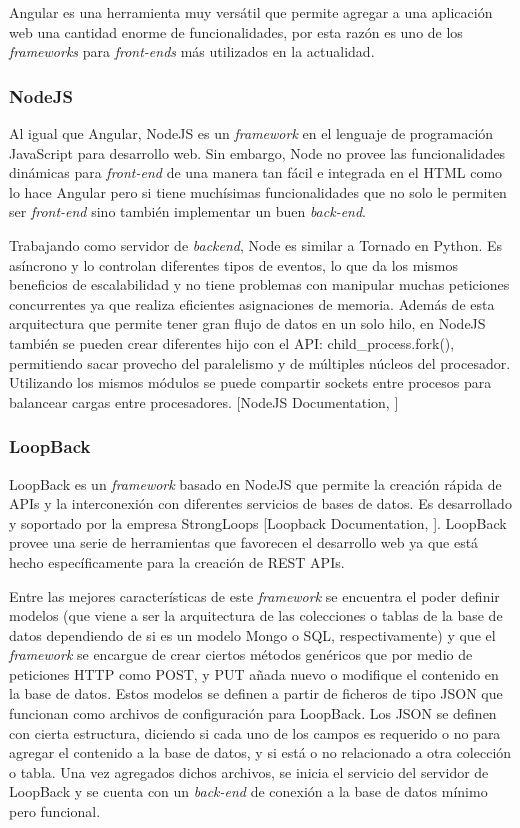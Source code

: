Angular es una herramienta muy versátil que permite agregar a una aplicación web una cantidad enorme de funcionalidades, por esta razón es uno de los \textit{frameworks} para \textit{front-ends} más utilizados en la actualidad.

\subsubsection{NodeJS}

Al igual que Angular, NodeJS es un \textit{framework} en el lenguaje de programación JavaScript para desarrollo web. Sin embargo, Node no provee las funcionalidades dinámicas para \textit{front-end} de una manera tan fácil e integrada en el HTML como lo hace Angular pero si tiene muchísimas funcionalidades que no solo le permiten ser \textit{front-end} sino también implementar un buen \textit{back-end}.

Trabajando como servidor de \textit{backend}, Node es similar a Tornado en Python. Es asíncrono y lo controlan diferentes tipos de eventos, lo que da los mismos beneficios de escalabilidad y no tiene problemas con manipular muchas peticiones concurrentes ya que realiza eficientes asignaciones de memoria. Además de esta arquitectura que permite tener gran flujo de datos en un solo hilo, en NodeJS también se pueden crear diferentes hijo con el API: child\_process.fork(), permitiendo sacar provecho del paralelismo y de múltiples núcleos del procesador. Utilizando los mismos módulos se puede compartir sockets entre procesos para balancear cargas entre procesadores. [NodeJS Documentation, \cite{nodejsdocs}]

\subsubsection{LoopBack}

LoopBack es un \textit{framework} basado en NodeJS que permite la creación rápida de APIs y la interconexión con diferentes servicios de bases de datos. Es desarrollado y soportado por la empresa StrongLoops [Loopback Documentation, \cite{loopbackdocs}]. LoopBack provee una serie de herramientas que favorecen el desarrollo web ya que está hecho específicamente para la creación de REST APIs.

Entre las mejores características de este \textit{framework} se encuentra el poder definir modelos (que viene a ser la arquitectura de las colecciones o tablas de la base de datos dependiendo de si es un modelo Mongo o SQL, respectivamente) y que el \textit{framework} se encargue de crear ciertos métodos genéricos que por medio de peticiones HTTP como POST, y PUT añada nuevo o modifique el contenido en la base de datos. Estos modelos se definen a partir de ficheros de tipo JSON que funcionan como archivos de configuración para LoopBack. Los JSON se definen con cierta estructura, diciendo si cada uno de los campos es requerido o no para agregar el contenido a la base de datos, y si está o no relacionado a otra colección o tabla. Una vez agregados dichos archivos, se inicia el servicio del servidor de LoopBack y se cuenta con un \textit{back-end} de conexión a la base de datos mínimo pero funcional.

